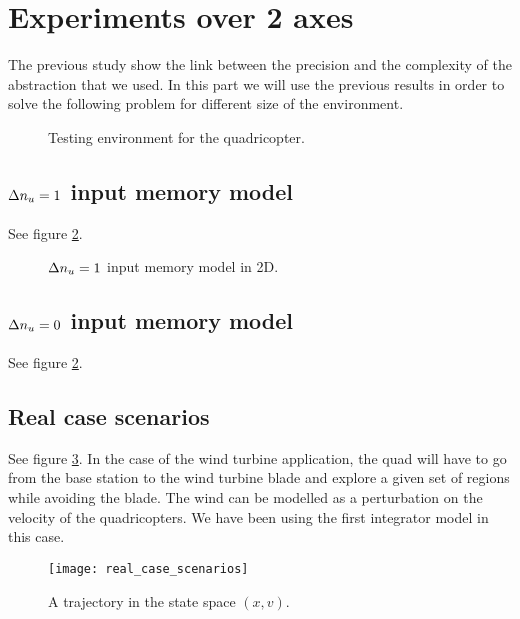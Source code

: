\section{Experiments over 2 axes}
The previous study show the link between the precision and the complexity of the abstraction that we used.
In this part we will use the previous results in order to solve the following problem for different size of the environment.
\begin{figure}
	\center
	
	\caption{Testing environment for the quadricopter.}
	\label{fig:environment}
\end{figure}


\subsection{$\Delta n_u = 1$ input memory model}
See figure \ref{fig:double_reduce_2D}.

\begin{figure*}
	\center
	
	\caption{$\Delta n_u=1$ input memory model in 2D.}
	\label{fig:double_reduce_2D}
\end{figure*}

\subsection{$\Delta n_u = 0$ input memory model}
See figure \ref{fig:double_reduce_2D}.


\subsection{Real case scenarios}
See figure \ref{fig:real_case}.
In the case of the wind turbine application, the quad will have to go from the base station to the wind turbine blade and explore a given set of regions while avoiding the blade.
The wind can be modelled as a perturbation on the velocity of the quadricopters.
We have been using the first integrator model in this case.

\begin{figure}[!ht]
  \centering
  \texttt{[image: real\_case\_scenarios]}
  \caption{A trajectory in the state space $(x,v)$.}
  \label{fig:real_case}
\end{figure}

